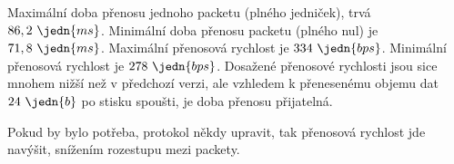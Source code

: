 Maximální doba přenosu jednoho packetu (plného jedniček), trvá $86,2~\jedn{ms}$. Minimální doba přenosu packetu (plného nul) je $71,8~\jedn{ms}$. Maximální přenosová rychlost je $334~\jedn{bps}$. Minimální přenosová rychlost je $278~\jedn{bps}$. Dosažené přenosové rychlosti jsou sice mnohem nižší než v předchozí verzi, ale vzhledem k přenesenému objemu dat $24~\jedn{b}$ po stisku spoušti, je doba přenosu přijatelná.

Pokud by bylo potřeba, protokol někdy upravit, tak přenosová rychlost jde navýšit, snížením rozestupu mezi packety.


